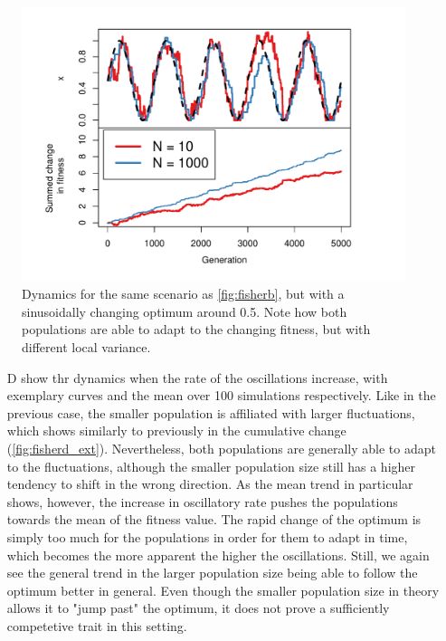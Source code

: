 \documentclass[10pt]{article}\usepackage[]{graphicx}\usepackage[]{color}
\makeatletter
\def\maxwidth{ %
  \ifdim\Gin@nat@width>\linewidth
    \linewidth
  \else
    \Gin@nat@width
  \fi
}
\theoremstyle{plain}
\makeatother
\begin{document}
\begin{multicols*}{2}
\begin{Schunk}
\begin{figure}[H]
{\centering \includegraphics[width=\maxwidth]{figure/twocolumn-fisherc-1} 

}

\caption{Dynamics for the same scenario as \cref{fig:fisherb}, but with a sinusoidally changing optimum around 0.5. Note how both populations are able to adapt to the changing fitness, but with different local variance.}\label{fig:fisherc}
\end{figure}
\end{Schunk}
\begin{enumerate}
  \item[D]  show thr dynamics when the rate of the oscillations increase, with exemplary curves and the mean over 100 simulations respectively. Like in the previous case, the smaller population is affiliated with larger fluctuations, which shows similarly to previously in the cumulative change (\cref{fig:fisherd_ext}). Nevertheless, both populations are generally able to adapt to the fluctuations, although the smaller population size still has a higher tendency to shift in the wrong direction. As the mean trend in particular shows, however, the increase in oscillatory rate pushes the populations towards the mean of the fitness value. The rapid change of the optimum is simply too much for the populations in order for them to adapt in time, which becomes the more apparent the higher the oscillations. Still, we again see the general trend in the larger population size being able to follow the optimum better in general. Even though the smaller population size in theory allows it to "jump past" the optimum, it does not prove a sufficiently competetive trait in this setting.
  

\end{enumerate}
\end{multicols*}
\end{document}
